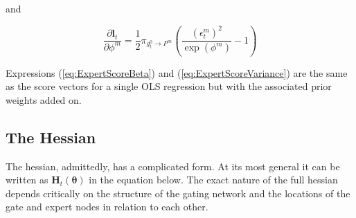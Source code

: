 \documentclass[12pt]{article}
\newcommand{\Ht}[1]{\mathbf{H}_{t}(#1)}
\newcommand{\gateprod}[2]{\pi_{#1 \longrightarrow #2}}
\begin{document}
and

\begin{equation} \label{eq:ExpertScoreVariance}
  \frac{\partial \boldsymbol{l}_{t}}{\partial \phi^{m}} = \frac{1}{2} \gateprod{g^{0}_{t}}{P^{m}} \left( \frac{( \epsilon^{m}_{t} )^{2}}{\exp{(\phi^{m})}} - 1 \right)
\end{equation}

Expressions (\ref{eq:ExpertScoreBeta}) and (\ref{eq:ExpertScoreVariance})
are the same as the score vectors for a single OLS regression but with
the associated prior weights added on.


\subsection{The Hessian} \label{sec:TheHessian}

The hessian, admittedly, has a complicated form. At its most general it
can be written as $\Ht{\boldsymbol{\theta}}$ in the equation below. The
exact nature of the full hessian depends critically on the structure of the
gating network and the locations of the gate and expert nodes in relation to 
each other.
\end{document}
